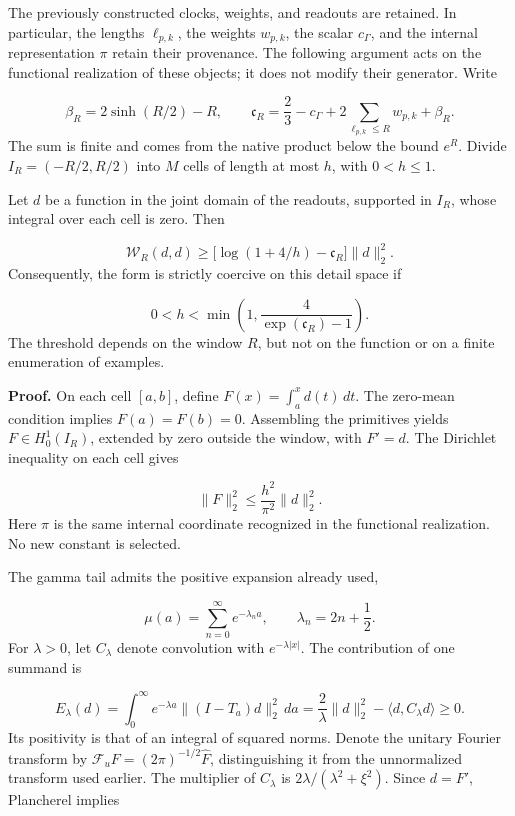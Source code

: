The previously constructed clocks, weights, and readouts are retained. In particular, the lengths \(\ell_{p,k}\), the weights \(w_{p,k}\), the scalar \(c_\Gamma\), and the internal representation \(\pi\) retain their provenance. The following argument acts on the functional realization of these objects; it does not modify their generator. Write

\[
\beta_R=2\sinh(R/2)-R,\qquad
\mathfrak c_R=\frac23-c_\Gamma+
2\sum_{\ell_{p,k}\leq R}w_{p,k}+\beta_R.
\]
The sum is finite and comes from the native product below the bound \(e^R\). Divide \(I_R=(-R/2,R/2)\) into \(M\) cells of length at most \(h\), with \(0<h\leq1\).

Let \(d\) be a function in the joint domain of the readouts, supported in \(I_R\), whose integral over each cell is zero. Then

\[
\boxed{\mathscr W_R(d,d)\geq
\bigl[\log(1+4/h)-\mathfrak c_R\bigr]\|d\|_2^2.}
\]
Consequently, the form is strictly coercive on this detail space if

\[
0<h<\min\left(1,\frac4{\exp(\mathfrak c_R)-1}\right).
\]
The threshold depends on the window \(R\), but not on the function or on a finite enumeration of examples.

\textbf{Proof.} On each cell \([a,b]\), define \(F(x)=\int_a^x d(t)\,dt\). The zero-mean condition implies \(F(a)=F(b)=0\). Assembling the primitives yields \(F\in H_0^1(I_R)\), extended by zero outside the window, with \(F'=d\). The Dirichlet inequality on each cell gives

\[
\|F\|_2^2\leq\frac{h^2}{\pi^2}\|d\|_2^2.
\]
Here \(\pi\) is the same internal coordinate recognized in the functional realization. No new constant is selected.

The gamma tail admits the positive expansion already used,

\[
\mu(a)=\sum_{n=0}^{\infty}e^{-\lambda_n a},
\qquad \lambda_n=2n+\frac12.
\]
For \(\lambda>0\), let \(C_\lambda\) denote convolution with \(e^{-\lambda|x|}\). The contribution of one summand is

\[
E_\lambda(d)=\int_0^\infty e^{-\lambda a}
\|(I-T_a)d\|_2^2\,da
=\frac2\lambda\|d\|_2^2-
\langle d,C_\lambda d\rangle\geq0.
\]
Its positivity is that of an integral of squared norms. Denote the unitary Fourier transform by \(\mathcal F_u F=(2\pi)^{-1/2}\widehat F\), distinguishing it from the unnormalized transform used earlier. The multiplier of \(C_\lambda\) is \(2\lambda/(\lambda^2+\xi^2)\). Since \(d=F'\), Plancherel implies

